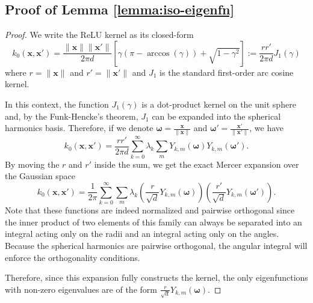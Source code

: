 \subsection{Proof of Lemma \ref{lemma:iso-eigenfn}}
\begin{proof}
    We write the ReLU kernel as its closed-form
    \[
        k_0(\bm x, \bm x') = \frac{\|\bm x\|\|\bm x'\|}{2 \pi d}\left[\gamma(\pi -\arccos (\gamma)) +\sqrt{1 - \gamma^2}\right] := \frac{r r'}{2 \pi d}J_1(\gamma)
    \]
    where $r = \|\bm x\|$ and $r' = \|\bm x'\|$ and $J_1$ is the standard first-order arc cosine kernel.
    
    In this context, the function $J_1(\gamma)$ is a dot-product kernel on the unit sphere and, by the Funk-Hencke's theorem, $J_1$ can be expanded into the spherical harmonics basis. Therefore, if we denote $\bm \omega = \frac{\bm x}{\|\bm x\|}$ and $\bm \omega' = \frac{\bm x'}{\|\bm x'\|}$, we have
    \[
        k_0(\bm x, \bm x') = \frac{r r'}{2 \pi d} \sum_{k=0}^{\infty} \lambda_k \sum_{m} Y_{k,m}(\bm \omega) Y_{k,m}(\bm \omega').
    \]
    By moving the $r$ and $r'$ inside the sum, we get the exact Mercer expansion over the Gaussian space
    \[
        k_0(\bm x, \bm x') = \frac{1}{2 \pi}\sum_{k=0}^{\infty} \sum_{m} \lambda_k \left( \frac{r}{\sqrt {d}} Y_{k,m}(\bm \omega) \right) \left( \frac{r'}{\sqrt{d}} Y_{k,m}(\bm \omega') \right).
    \]
    Note that these functions are indeed normalized and pairwise orthogonal since the inner product of two elements of this family can always be separated into an integral acting only on the radii and an integral acting only on the angles. Because the spherical harmonics are pairwise orthogonal, the angular integral will enforce the orthogonality conditions.
    
    Therefore, since this expansion fully constructs the kernel, the only eigenfunctions with non-zero eigenvalues are of the form $\frac{r}{\sqrt d} Y_{k,m}(\bm \omega)$.
\end{proof}
